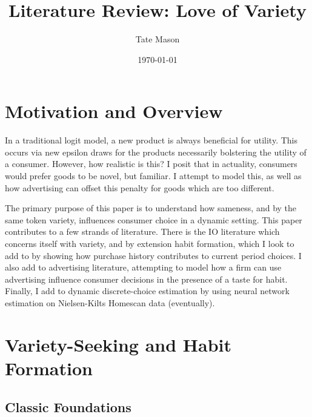 \documentclass[12pt]{article}
\title{%
    \textbf{Literature Review: Love of Variety}\\[6pt]
}
\author{Tate Mason \\
}
\date{\today}
\begin{document}

\maketitle
\thispagestyle{empty}

\newpage

\section{Motivation and Overview}

In a traditional logit model, a new product is always beneficial for utility. This occurs via new epsilon draws for the products necessarily bolstering the utility of a consumer. However, how realistic is this? I posit that in actuality, consumers would prefer goods to be novel, but familiar. I attempt to model this, as well as how advertising can offset this penalty for goods which are too different.

The primary purpose of this paper is to understand how sameness, and by the same token variety, influences consumer choice in a dynamic setting. This paper contributes to a few strands of literature. There is the IO literature which concerns itself with variety, and by extension habit formation, which I look to add to by showing how purchase history contributes to current period choices. I also add to advertising literature, attempting to model how a firm can use advertising influence consumer decisions in the presence of a taste for habit. Finally, I add to dynamic discrete-choice estimation by using neural network estimation on Nielsen-Kilts Homescan data (eventually).

\section{Variety-Seeking and Habit Formation}

\subsection{Classic Foundations}
\end{document}
